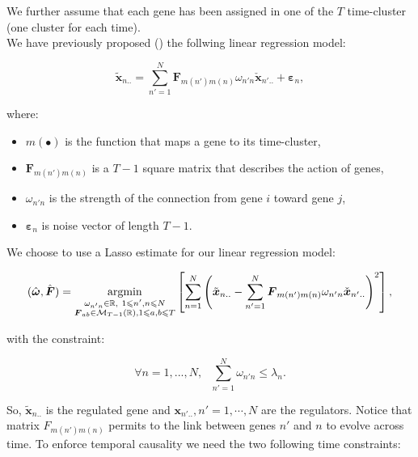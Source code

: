 \documentclass[a4paper]{article}
\renewcommand{\leq}{\leqslant}
\begin{document}
We further assume that each gene has been assigned in one of the $T$ time-cluster (one cluster for each time).\\


We have previously proposed (\cite{vallat2013reverse}) the follwing linear regression model:

$$
\tilde{\boldsymbol{x}}_{n..} = \sum_{n'=1}^{N} \boldsymbol{F}_{m(n')m(n)} \omega_{n'n} \check{\boldsymbol{x}}_{n'..} +\boldsymbol{\varepsilon}_{n},
$$

where:   \\

\begin{itemize}
\item $m(\bullet)$ is the function that maps a gene to its time-cluster,
\item $\boldsymbol{F}_{m(n')m(n)} $ is a $T-1$ square matrix that describes the action of genes,
\item $\omega_{n'n}$ is the strength of the connection from gene $i$ toward gene $j$,
\item $\boldsymbol{\varepsilon}_{n}$ is noise vector of length $T-1$. \\
\end{itemize} 

We choose to use a Lasso estimate for our linear regression model:


\begin{equation*} 
(\hat{\boldsymbol{\omega}},\hat{\boldsymbol{F}})=\underset{\begin{subarray}{c}
\omega_{n'n} \in \mathbb{R},~1\leq n',n\leq N\\
\boldsymbol{F}_{ab} \in \mathcal{M}_{T-1}(\mathbb{R}), 1\leq a,b \leq T
  \end{subarray} }{\operatorname{argmin} }\left[ \sum_{n=1}^{N}\left(\tilde{\boldsymbol{x}}_{n..} - \sum_{n'=1}^{N} \boldsymbol{F}_{m(n')m(n)} \omega_{n'n} \check{\boldsymbol{x}}_{n'..}\right)^2\right],
\end{equation*}

with the constraint: 

$$
\forall n = 1,...,N, ~~~ \sum_{n'=1}^N \omega_{n'n} \leq {\lambda_n}.
$$




So, $\tilde{\boldsymbol{x}}_{n..}$ is the regulated gene and $\boldsymbol{x}_{n'..}, n'=1,\dotsb,N$ are the regulators.  Notice that matrix $  F_{m(n')m(n)}$ permits to the link between genes $n'$ and $n$ to evolve across time. To enforce temporal causality we need the two following time constraints:
\end{document}
